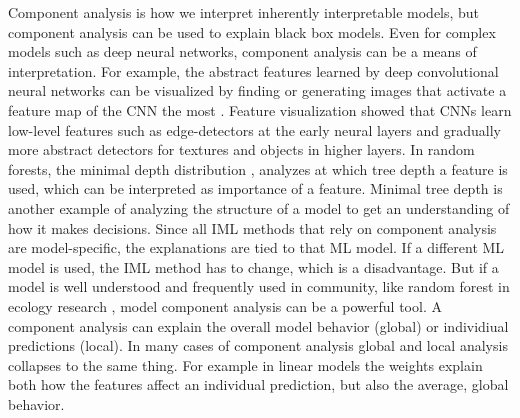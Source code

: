 \documentclass[runningheads]{llncs}
\begin{document}
Component analysis is how we interpret inherently interpretable models, but component analysis can be used to explain black box models.
Even for complex models such as deep neural networks, component analysis can be a means of interpretation.
For example, the abstract features learned by deep convolutional neural networks can be visualized by finding or generating images that activate a feature map of the CNN the most \cite{olah2017feature}.
Feature visualization showed that CNNs learn low-level features such as edge-detectors at the early neural layers and gradually more abstract detectors for textures and objects in higher layers.
In random forests, the minimal depth distribution \cite{randomForestExplainer,ishwaran2010high}, analyzes at which tree depth a feature is used, which can be interpreted as importance of a feature.
Minimal tree depth is another example of analyzing the structure of a model to get an understanding of how it makes decisions.
Since all IML methods that rely on component analysis are model-specific, the explanations are tied to that ML model.
If a different ML model is used, the IML method has to change, which is a disadvantage.
But if a model is well understood and frequently used in community, like random forest in ecology research \cite{cutler2007random}, model component analysis can be a powerful tool.
A component analysis can explain the overall model behavior (global) or individiual predictions (local).
In many cases of component analysis global and local analysis collapses to the same thing.
For example in linear models the weights explain both how the features affect an individual prediction, but also the average, global behavior.
\end{document}
